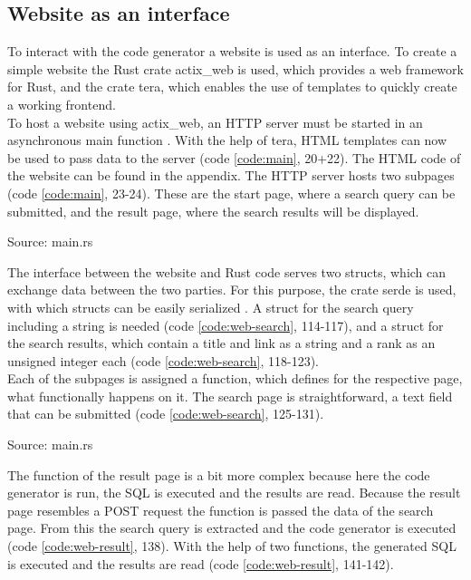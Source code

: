 \subsection{Website as an interface}
To interact with the code generator a website is used as an interface. To create a simple website the Rust crate actix\_web is used, which provides a web framework for Rust, and the crate tera, which enables the use of templates to quickly create a working frontend.\\
To host a website using actix\_web, an HTTP server must be started in an asynchronous main function \parencite[cf.][n.p.]{ede_actix_2022}. With the help of tera, HTML templates can now be used \parencite[cf.][n.p.]{prouillet_tera_2022} to pass data to the server (code \ref{code:main}, 20+22). The HTML code of the website can be found in the appendix. The HTTP server hosts two subpages (code \ref{code:main}, 23-24). These are the start page, where a search query can be submitted, and the result page, where the search results will be displayed.
\begin{codeenv}
    \label{code:main}
    
    \centerline{Source: main.rs}
\end{codeenv}
The interface between the website and Rust code serves two structs, which can exchange data between the two parties. For this purpose, the crate serde is used, with which structs can be easily serialized \parencite[cf.][n.p.]{tolnay_serde_2017}. A struct for the search query including a string is needed (code \ref{code:web-search}, 114-117), and a struct for the search results, which contain a title and link as a string and a rank as an unsigned integer each (code \ref{code:web-search}, 118-123).\\
Each of the subpages is assigned a function, which defines for the respective page, what functionally happens on it. The search page is straightforward, a text field that can be submitted (code \ref{code:web-search}, 125-131).
\begin{codeenv}
    \label{code:web-search}
    
    \centerline{Source: main.rs}
\end{codeenv}
The function of the result page is a bit more complex because here the code generator is run, the \ac{SQL} is executed and the results are read. Because the result page resembles a POST request the function is passed the data of the search page. From this the search query is extracted and the code generator is executed (code \ref{code:web-result}, 138). With the help of two functions, the generated \ac{SQL} is executed and the results are read (code \ref{code:web-result}, 141-142).\\
